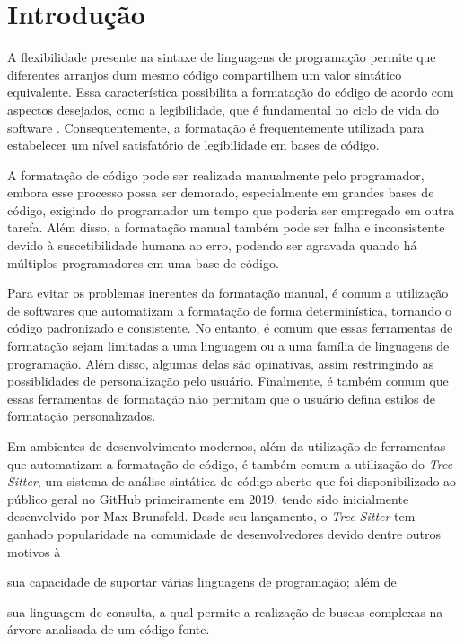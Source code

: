 \documentclass
 [11pt,a4paper,english,brazil,openright,sumario=tradicional,twoside]
 {abntex2}
\newcommand{\treesitter}{\textit{Tree-Sitter}\xspace}
\begin{document}
 \textual


 \chapter{Introdução}

 A flexibilidade presente na sintaxe de linguagens de programação permite que
 diferentes arranjos dum mesmo código compartilhem um valor sintático
 equivalente. Essa característica possibilita a formatação do código de acordo
 com aspectos desejados, como a legibilidade, que é fundamental no ciclo de
 vida do software \cites[546]{buse-2009-learning}[1]{oliveira-2020-evaluating}.
 Consequentemente, a formatação é frequentemente utilizada para estabelecer um
 nível satisfatório de legibilidade em bases de código.

 A formatação de código pode ser realizada manualmente pelo programador, embora
 esse processo possa ser demorado, especialmente em grandes bases de código,
 exigindo do programador um tempo que poderia ser empregado em outra tarefa.
 Além disso, a formatação manual também pode ser falha e inconsistente devido à
 suscetibilidade humana ao erro, podendo ser agravada quando há múltiplos
 programadores em uma base de código.

 Para evitar os problemas inerentes da formatação manual, é comum a utilização
 de softwares que automatizam a formatação de forma determinística, tornando o
 código padronizado e consistente. No entanto, é comum que essas ferramentas de
 formatação sejam limitadas a uma linguagem ou a uma família de linguagens de
 programação. Além disso, algumas delas são opinativas, assim restringindo as
 possiblidades de personalização pelo usuário. Finalmente, é também comum que
 essas ferramentas de formatação não permitam que o usuário defina estilos de
 formatação personalizados.

 Em ambientes de desenvolvimento modernos, além da utilização de ferramentas
 que automatizam a formatação de código, é também comum a utilização do
 \treesitter \cite{tree-sitter-2018-tree}, um sistema de análise sintática de
 código aberto que foi disponibilizado ao público geral no GitHub primeiramente
 em 2019, tendo sido inicialmente desenvolvido por Max Brunsfeld. Desde seu
 lançamento, o \treesitter tem ganhado popularidade na comunidade de
 desenvolvedores devido dentre outros motivos à
 \begin{inparaenum}
  \item sua capacidade de suportar várias linguagens de programação; além de
  \item sua linguagem de consulta, a qual permite a realização de buscas
        complexas na árvore analisada de um código-fonte.
 \end{inparaenum}
\end{document}
